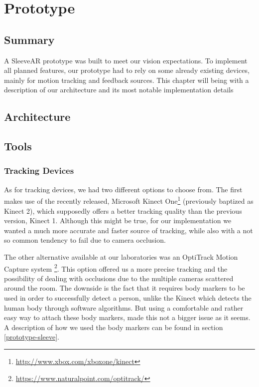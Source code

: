 \chapter{Prototype}
\label{sec:implementation}

\section*{Summary}
A SleeveAR prototype was built to meet our vision expectations. To implement all planned features, our prototype had to rely on some already existing devices, mainly for motion tracking and feedback sources. This chapter will being with a description of our architecture and its most notable implementation details



\section{Architecture}
\label{sec:impl:arch}



\section{Tools}
\label{sec:impl:tools}

\subsection{Tracking Devices}


As for tracking devices, we had two different options to choose from.
The first makes use of the recently released, Microsoft Kinect One\footnote{\url{http://www.xbox.com/xboxone/kinect}} 
(previously baptized as Kinect 2), which supposedly offers a better tracking quality than 
the previous version, Kinect 1. Although this might be true, for our implementation we wanted a much more accurate and faster source of tracking, while also with a not so common tendency to fail due to camera occlusion.

The other alternative available at our laboratories was an OptiTrack Motion Capture system \footnote{\url{https://www.naturalpoint.com/optitrack/}}. 
This option offered us a more precise tracking and the possibility of dealing with occlusions due to the multiple cameras scattered around the room. 
The downside is the fact that it requires body markers to be used in order to successfully detect a person, unlike the 
Kinect which detects the human body through software algorithms. 
But using a comfortable and rather easy way to attach these body markers, made this not a bigger issue as it seems. 
A description of how we used the body markers can be found in section \ref{prototype-sleeve}.



